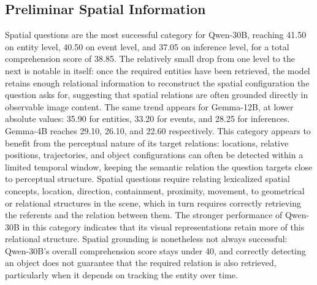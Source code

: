 \subsection*{Preliminar Spatial Information}
\label{subsec:preliminary_spatial}
Spatial questions are the most successful category for Qwen-30B, reaching 41.50 on entity level, 40.50 on event level, and 37.05 on inference level, for a total comprehension score of 38.85. The relatively small drop from one level to the next is notable in itself: once the required entities have been retrieved, the model retains enough relational information to reconstruct the spatial configuration the question asks for, suggesting that spatial relations are often grounded directly in observable image content.
The same trend appears for Gemma-12B, at lower absolute values: 35.90 for entities, 33.20 for events, and 28.25 for inferences. Gemma-4B    reaches 29.10, 26.10, and 22.60 respectively. This category appears to benefit from the perceptual nature of its target relations: locations, relative positions, trajectories, and object configurations can often be detected within a limited temporal window, keeping the semantic relation the question targets close to perceptual structure.
Spatial questions require relating lexicalized spatial concepts, location, direction, containment, proximity, movement, to geometrical or relational structures in the scene, which in turn requires correctly retrieving the referents and the relation between them. The stronger performance of Qwen-30B in this category indicates that its visual representations retain more of this relational structure. Spatial grounding is nonetheless not always successful: Qwen-30B's overall comprehension score stays under 40, and correctly detecting an object does not guarantee that the required relation is also retrieved, particularly when it depends on tracking the entity over time.
